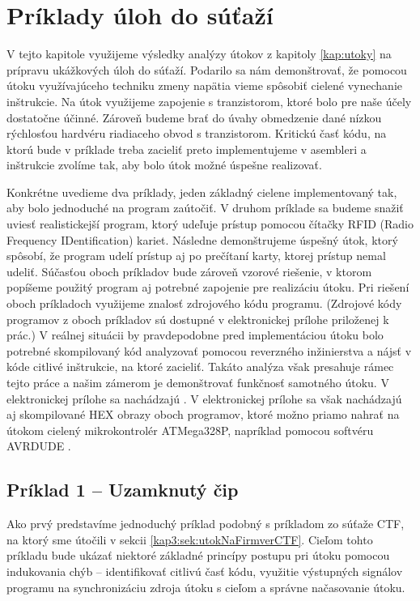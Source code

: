 \chapter{Príklady úloh do súťaží}
\label{kap:CTF}

V tejto kapitole využijeme výsledky analýzy útokov z kapitoly \ref{kap:utoky} na prípravu ukážkových úloh do súťaží. Podarilo sa nám demonštrovať, že pomocou útoku využívajúceho techniku zmeny napätia vieme spôsobiť cielené vynechanie inštrukcie. Na útok využijeme zapojenie s tranzistorom, ktoré bolo pre naše účely dostatočne účinné. Zároveň budeme brať do úvahy obmedzenie dané nízkou rýchlosťou hardvéru riadiaceho obvod s tranzistorom. Kritickú časť kódu, na ktorú bude v príklade treba zacieliť preto implementujeme v asembleri a inštrukcie zvolíme tak, aby bolo útok možné úspešne realizovať.

Konkrétne uvedieme dva príklady, jeden základný cielene implementovaný tak, aby bolo jednoduché na program zaútočiť. V druhom príklade sa budeme snažiť uviesť realistickejší program, ktorý udeľuje prístup pomocou čítačky RFID (Radio Frequency IDentification) kariet. Následne demonštrujeme úspešný útok, ktorý spôsobí, že program udelí prístup aj po prečítaní karty, ktorej prístup nemal udeliť. Súčasťou oboch príkladov bude zároveň vzorové riešenie, v ktorom popíšeme použitý program aj potrebné zapojenie pre realizáciu útoku. Pri riešení oboch príkladoch využijeme znalosť zdrojového kódu programu. (Zdrojové kódy programov z oboch príkladov sú dostupné v elektronickej prílohe priloženej k prác.) V reálnej situácii by pravdepodobne pred implementáciou útoku bolo potrebné skompilovaný kód analyzovať pomocou reverzného inžinierstva a nájsť v kóde citlivé inštrukcie, na ktoré zacieliť. Takáto analýza však presahuje rámec tejto práce a našim zámerom je demonštrovať funkčnosť samotného útoku. V elektronickej prílohe sa nachádzajú . V elektronickej prílohe sa však nachádzajú aj skompilované HEX obrazy oboch programov, ktoré možno priamo nahrať na útokom cielený mikrokontrolér ATMega328P, napríklad pomocou softvéru AVRDUDE \cite{avrdude}.

\section{Príklad 1 -- Uzamknutý čip} \label{kap4:sek:priklad1}
Ako prvý predstavíme jednoduchý príklad podobný s príkladom zo súťaže CTF, na ktorý sme útočili v sekcii \ref{kap3:sek:utokNaFirmverCTF}. Cieľom tohto príkladu bude ukázať niektoré základné princípy postupu pri útoku pomocou indukovania chýb -- identifikovať citlivú časť kódu, využitie výstupných signálov programu na synchronizáciu zdroja útoku s cieľom a správne načasovanie útoku.

